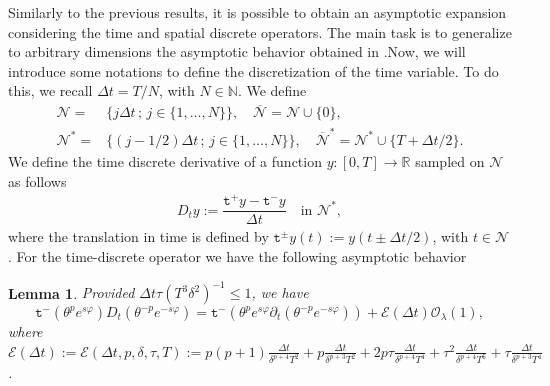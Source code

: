 \documentclass[11pt,oneside,leqno]{amsart}
\numberwithin{equation}{section}
\numberwithin{equation}{section}
\newtheorem{lemma}[theorem]{Lemma}
\newcommand{\trp}{\mathtt t^+}
\newcommand{\trm}{\mathtt t^-}
\newcommand{\trpm}{\mathtt t^\pm}
\begin{document}
Similarly to the previous results, it is possible to obtain an asymptotic expansion considering the time and spatial discrete operators. The main task is to generalize to arbitrary dimensions the asymptotic behavior obtained in \cite{LMPZ:2023}.Now, we will introduce some notations to define the discretization of the time variable. To do this, we recall $\Delta t= T/N$, with $N\in \mathbb{N}$. We define
\begin{align*}
    \mathcal{N}=&\{j\Delta t\,;\, j\in \{ 1,\ldots, N\}\}, \quad \overline{\mathcal{N}}=\mathcal{N}\cup \{0\},\\
    \mathcal{N}^{\ast}=&\{(j-1/2)\Delta t\,;\, j\in \{1,\ldots,N\}\},\quad \overline{\mathcal{N}}^*=\mathcal{N}^{\ast} \cup \{T+\Delta t/2\}. 
\end{align*}
We define the time discrete derivative of a function $y:[0,T]\to \mathbb{R}$ sampled on $\mathcal{N}$ as follows
\begin{align*}
    D_{t} y:=\dfrac{\trp    y-\trm   y}{\Delta t}\quad \text{in } \mathcal{N}^{\ast},
\end{align*}
where the translation in time is defined by $\trpm y(t):=y(t\pm \Delta t/2)$, with $t\in \mathcal{N}$. For the time-discrete operator  we have the following asymptotic behavior
\begin{lemma}\label{lem:time:discrete:weight}
    Provided $\Delta t\tau(T^{3}\delta^{2})^{-1}\leq 1$, we have
    \begin{equation}\label{eq:theta:D:t}
        \trm(\theta^{p}e^{s\varphi})D_{t}(\theta^{-p}e^{-s\varphi})=\trm(\theta^{p}e^{s\varphi}\partial_{t}(\theta^{-p}e^{-s\varphi}))+\mathcal{E}(\Delta t) \mathcal{O}_{\lambda}(1),
    \end{equation}
    where $\mathcal{E}(\Delta t):=\mathcal{E}(\Delta t, p,\delta,\tau,T):=p(p+1)\frac{\Delta t}{\delta^{p+4}T^{2}}+p\frac{\Delta t}{\delta^{p+3}T^{2}}
    +2p\tau\frac{\Delta t}{\delta^{p+4}T^{4}}+\tau^{2} \frac{\Delta t}{\delta^{p+4}T^{6}}+\tau\frac{\Delta t}{\delta^{p+3}T^{4}}$.
\end{lemma}
\end{document}
